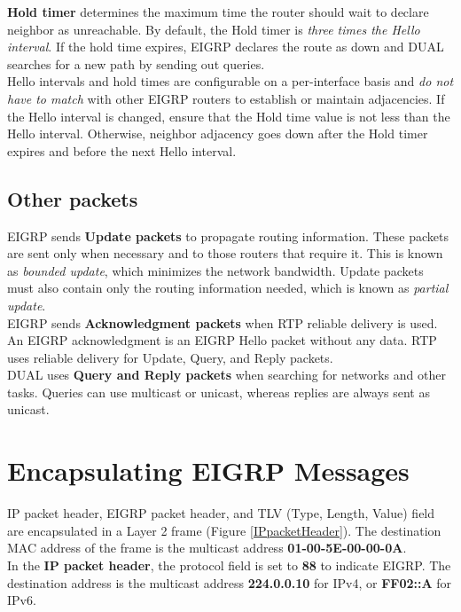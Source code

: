 \textbf{Hold timer} determines the maximum time the router should wait to declare neighbor as unreachable. By default, the Hold timer is \emph{three times the Hello interval}. If the hold time expires, EIGRP declares the route as down and DUAL searches for a new path by sending out queries.\\

Hello intervals and hold times are configurable on a per-interface basis and \emph{do not have to match} with other EIGRP routers to establish or maintain adjacencies. If the Hello interval is changed, ensure that the Hold time value is not less than the Hello interval. Otherwise, neighbor adjacency goes down after the Hold timer expires and before the next Hello interval. 

\subsection{Other packets}

EIGRP sends \textbf{Update packets} to propagate routing information. These packets are sent only when necessary and to those routers that require it. This is known as \emph{bounded update}, which minimizes the network bandwidth. Update packets must also contain only the routing information needed, which is known as \emph{partial update}.\\

EIGRP sends \textbf{Acknowledgment packets} when RTP reliable delivery is used. An EIGRP acknowledgment is an EIGRP Hello packet without any data. RTP uses reliable delivery for Update, Query, and Reply packets.\\

DUAL uses \textbf{Query and Reply packets} when searching for networks and other tasks. Queries can use multicast or unicast, whereas replies are always sent as unicast.

\section{Encapsulating EIGRP Messages}

IP packet header, EIGRP packet header, and TLV (Type, Length, Value) field are encapsulated in a Layer 2 frame (Figure \ref{IPpacketHeader}). The destination MAC address of the frame is the multicast address \textbf{01-00-5E-00-00-0A}.\\

In the \textbf{IP packet header}, the protocol field is set to \textbf{88} to indicate EIGRP. The destination address is the multicast address \textbf{224.0.0.10} for IPv4, or \textbf{FF02::A} for IPv6. 

